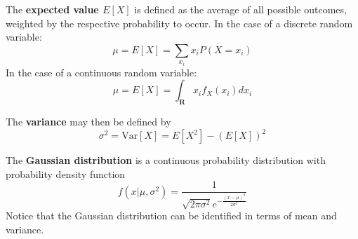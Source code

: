 The \textbf{expected value $E[X]$} is defined as the average of all possible outcomes, weighted by the respective probability to occur.
In the case of a discrete random variable: \[ \mu = E[X] = \sum_{x_i} x_i P(X=x_i)  \]
In the case of a continuous random variable: \[ \mu = E[X] = \int_{\mathbf{R}} x_i f_X(x_i)dx_i  \]

The \textbf{variance} may then be defined by \[ \sigma^2 = \text{Var}[X] = E[X^2] - (E[X])^2 \]

The \textbf{Gaussian distribution} is a continuous probability distribution with probability density function \[ f(x | \mu, \sigma^2) = \frac{1}{\sqrt{2 \pi \sigma^2}e^{-\frac{(x-\mu)^2}{2\sigma^2}}} \]
Notice that the Gaussian distribution can be identified in terms of mean and variance.
